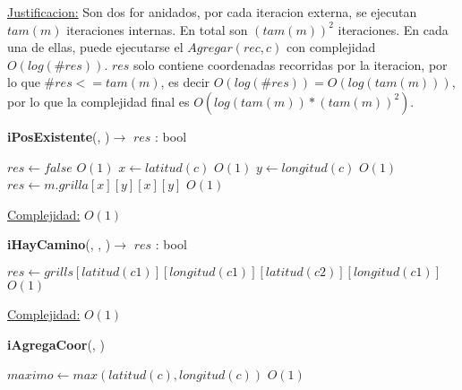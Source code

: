 \begin{Algoritmos}
\begin{algorithm}[H]
\begin{algorithmic}[1]
\Statex \underline{Justificacion:} Son dos for anidados, por cada iteracion externa, se ejecutan $tam(m)$ iteraciones internas. En total son $(tam(m))^2$ iteraciones. En cada una de ellas, puede ejecutarse el $Agregar(rec, c)$ con complejidad $O(log(\#res))$. $res$ solo contiene coordenadas recorridas por la iteracion, por lo que $\#res <= tam(m)$, es decir $O(log(\#res)) = O(log(tam(m)))$, por lo que la complejidad final es $O(log(tam(m))*(tam(m))^2)$.

\end{algorithmic}
\end{algorithm}


\begin{algorithm}[H]
{\textbf{iPosExistente}(, )$\to$ $res$ : bool}
\begin{algorithmic}[1]
   

	\State $res \gets false$ \Comment $O(1)$
\Else
	\State $x \gets latitud(c)$ \Comment $O(1)$
	\State $y \gets longitud(c)$ \Comment $O(1)$
	\State $res \gets m.grilla[x][y][x][y]$ \Comment $O(1)$
\EndIf


\medskip
\Statex \underline{Complejidad:} $O(1)$


\end{algorithmic}
\end{algorithm}


\begin{algorithm}[H]
{\textbf{iHayCamino}(, , )$\to$ $res$ : bool}
\begin{algorithmic}[1]

\State $res \gets grills[latitud(c1)][longitud(c1)][latitud(c2)][longitud(c1)]$ \Comment $O(1)$

\medskip
\Statex \underline{Complejidad:} $O(1)$


\end{algorithmic}
\end{algorithm}




{\textbf{iAgregaCoor}(, )}
\begin{algorithmic}[1]

\State $maximo \gets max(latitud(c), longitud(c)) $ \Comment $O(1)$


\end{algorithmic}
\end{Algoritmos}
